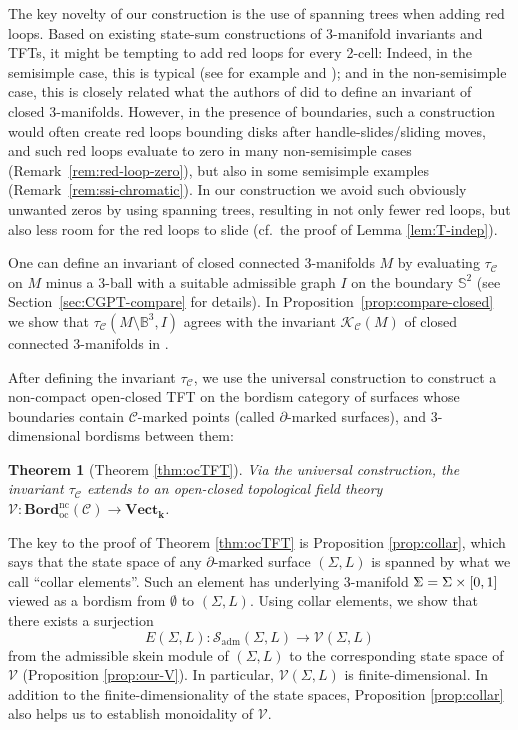 \documentclass[11pt]{amsart}
\newtheorem{thm}{Theorem}[section]
\theoremstyle{definition}
\numberwithin{equation}{section}
\def\bd{{\partial}}
\def\adm{\operatorname{adm}}
\def\ourBord{\mathbf{Bord}^{\operatorname{nc}}_{\operatorname{oc}}}
\def\ourV{\cV}
\def\sk{\cS}
\newcommand{\bbSigma}{%
  \mathord{
    \tikz[baseline=(char.base)]{
      \node[inner sep=0pt] (char) {$\Sigma$}; %
\begin{scope}[xshift=0.5]
      \draw[line width=0.3pt] (-0.05,0.115)--(0.03,0.002);
      \draw[line width=0.3pt] (-0.06,-0.115)--(0.035,0.004);
\end{scope}
    }
  }
}
\def\cC{\mathcal{C}}
\def\cS{\mathcal{S}}
\def\cV{\mathcal{V}}
\def\bB{{\mathbb{B}}}
\def\bS{{\mathbb{S}}}
\def\kk{{\bm{k}}}
\def\to{\rightarrow}
\def\Vect{{\mathbf{Vect}}}
\begin{document}
The key novelty of our construction is the use of spanning trees when adding red loops. Based on existing state-sum constructions of 3-manifold invariants and TFTs, it might be tempting to add red loops for every 2-cell: Indeed, in the semisimple case, this is typical (see for example \cite{atfd1} and \cite{SS25}); 
and in the non-semisimple case, this is closely related what the authors of \cite{CGPT20-Kup} did to define an invariant of closed 3-manifolds. However, in the presence of boundaries, such a construction would often create red loops bounding disks after handle-slides/sliding moves, and such red loops evaluate to zero in many non-semisimple cases  (Remark~\ref{rem:red-loop-zero}), 
but also in some semisimple examples (Remark~\ref{rem:ssi-chromatic}). 
In our construction we avoid such obviously unwanted zeros by using spanning trees, resulting in not only fewer red loops, but also less room for the red loops to slide (cf.~the proof of Lemma \ref{lem:T-indep}).


One can define an invariant of closed connected 3-manifolds $M$ by evaluating $\tau_\cC$ on $M$ minus a 3-ball with a suitable admissible graph $I$ on the boundary $\bS^2$ (see Section~\ref{sec:CGPT-compare} for details).
In Proposition~\ref{prop:compare-closed} we show that $\tau_\cC(M \setminus \bB^3,I)$ agrees with the invariant $\mathcal{K}_\cC(M)$ of closed connected 3-manifolds in \cite{CGPT20-Kup}.
    
\medskip
After defining the invariant $\tau_{\cC}$, we use the universal construction to construct a non-compact open-closed TFT on the bordism category of surfaces whose boundaries contain $\cC$-marked points (called $\bd$-marked surfaces), and 3-dimensional bordisms between them: 

\begin{thm}[Theorem \ref{thm:ocTFT}]
Via the universal construction, the invariant $\tau_{\cC}$ extends to an open-closed topological field theory $\ourV: \ourBord(\cC) \to \Vect_{\kk}$.     
\end{thm}

The key to the proof of Theorem \ref{thm:ocTFT} is Proposition \ref{prop:collar}, which says that the state space of any $\bd$-marked surface $(\Sigma, L)$ is spanned by what we call ``collar elements''. 
Such an element has underlying 3-manifold $\bbSigma = \Sigma \times [0,1]$ viewed as a bordism from $\emptyset$ to $(\Sigma, L)$. 
Using collar elements, we show that there exists a surjection 
\[E(\Sigma, L): \sk_{\adm}(\Sigma, L) \to \ourV(\Sigma, L)\]
from the admissible skein module of $(\Sigma, L)$ to the corresponding state space of $\ourV$ (Proposition \ref{prop:our-V}). In particular, $\ourV(\Sigma, L)$ is finite-dimensional.
In addition to the finite-dimensionality of the state spaces, Proposition \ref{prop:collar} also helps us to establish monoidality of $\ourV$. 
\end{document}
